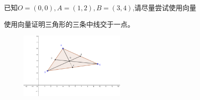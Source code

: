 \documentclass{exercise_wvqusrai}
\begin{document}
\begin{questions}
\question[10]
已知$O=(0,0),A=(1,2),B=(3,4)$,请尽量尝试使用向量

\question[20]
使用向量证明三角形的三条中线交于一点。
\begin{figure}[h]
    \centering
    \includegraphics[width=5.2cm,keepaspectratio]{barycenter.PNG}
    \label{fig:geometric_barycenter}
\end{figure}
\end{questions}
\end{document}
